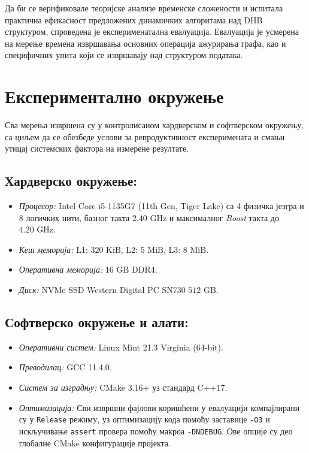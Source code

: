 
Да би се верификовале теоријске анализе временске сложености и испитала практична ефикасност предложених динамичких алгоритама над DHB структуром, спроведена је експерименатална евалуација. Евалуација је усмерена на мерење времена извршавања основних операција ажурирања графа, као и специфичних упита који се извршавају над структуром података.

\section{Експериментално окружење}

Сва мерења извршена су у контролисаном хардверском и софтверском окружењу, са циљем да се обезбеде услови за репродуктивност експеримената и смањи утицај системских фактора на измерене резултате.

\subsection{Хардверско окружење:}

\begin{itemize}

\item \emph{Процесор:} Intel Core i5-1135G7 (11th Gen, Tiger Lake) са 4 физичка језгра и 8 логичких нити, базног такта $2.40\text{ GHz}$ и максималног \textit{Boost} такта до $4.20\text{ GHz}$.
\item \emph{Кеш меморија:} L1: $320\text{ KiB}$, L2: $5\text{ MiB}$, L3: $8\text{ MiB}$.
\item \emph{Оперативна меморија:} $16\text{ GB}$ DDR4.
\item \emph{Диск:} NVMe SSD Western Digital PC SN730 $512\text{ GB}$.

\end{itemize}

\subsection{Софтверско окружење и алати:}

\begin{itemize}

\item \emph{Оперативни систем:} Linux Mint 21.3 Virginia (64-bit).
\item \emph{Преводилац:} GCC 11.4.0.
\item \emph{Систем за изградњу:} CMake 3.16+ уз стандард C++17.
\item \emph{Оптимизација:} Сви извршни фајлови коришћени у евалуацији компајлирани су у \texttt{Release} режиму, уз оптимизацију кода помоћу заставице \texttt{-O3} и искључивање \texttt{assert} провера помоћу макроа \texttt{-DNDEBUG}. Ове опције су део глобалне CMake конфигурације пројекта.

\end{itemize}

